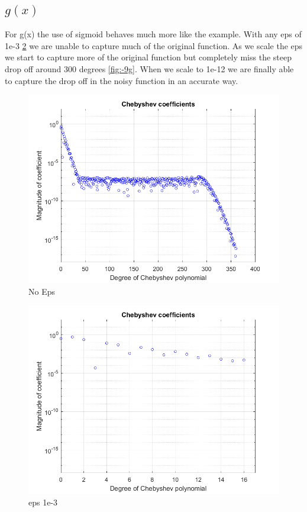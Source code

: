 \documentclass{article}
\begin{document}
\subsection{$g(x) $}
For g(x) the use of sigmoid behaves much more like the example. With any eps of 1e-3 \ref{fig:-3g} we are unable to capture much of the original function. As we scale the eps we start to capture more of the original function but completely miss the steep drop off around 300 degrees \ref{fig:-9g}. When we scale to 1e-12 we are finally able to capture the drop off in the noisy function in an accurate way. 
\begin{figure}[h!]
\centering
\includegraphics[scale=.5]{gnone.png}
\caption{No Eps}
\label{fig:gnone}
\end{figure}
\begin{figure}[h!]
\centering
\includegraphics[scale=.5]{-3g.png}
\caption{eps 1e-3}
\label{fig:-3g}
\end{figure}
\end{document}
